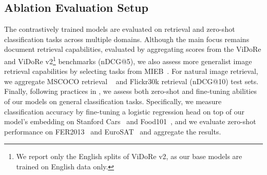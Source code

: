\subsection{Ablation Evaluation Setup}


The contrastively trained models are evaluated on retrieval and zero-shot classification tasks across multiple domains. Although the main focus remains document retrieval capabilities, evaluated by aggregating scores from the ViDoRe and ViDoRe v2\footnote{\label{fn:vidorev2}We report only the English splits of ViDoRe v2, as our base models are trained on English data only.} \citep{macé2025vidorebenchmarkv2raising} benchmarks (nDCG@5), we also assess more generalist image retrieval capabilities by selecting tasks from MIEB~\citep{xiao2025miebmassiveimageembedding}. For natural image retrieval, we aggregate MSCOCO retrieval ~\citep{lin2015microsoftcococommonobjects} and Flickr30k retrieval (nDCG@10) \citep{plummer2016flickr30kentitiescollectingregiontophrase} test sets. Finally, following practices in \citep{muennighoff_mteb_2022}, we assess both zero-shot and fine-tuning abilities of our models on general classification tasks. Specifically, we measure classification accuracy by fine-tuning a logistic regression head on top of our model's embedding on Stanford Cars~\citep{6755945} and Food101~\citep{10.1007/978-3-319-10599-4_29}, and we evaluate zero-shot performance on FER2013~\citep{khaireddin2021facialemotionrecognitionstate} and EuroSAT~\citep{helber2019eurosatnoveldatasetdeep} and aggregate the results.

